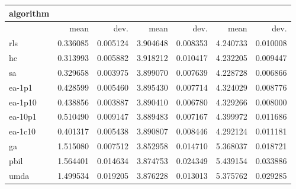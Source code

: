 \begin{tabular}{@{}l*{6}{>{{}}N{1}{2}}@{}}
\toprule
{algorithm} &  &  &  \\
\midrule
& {mean} & {dev.} & {mean} & {dev.} & {mean} & {dev.} \\
\midrule
rls & 0.336085 & 0.005124 & 3.904648 & 0.008353 & 4.240733 & 0.010008 \\
 hc & 0.313993 & 0.005882 & 3.918212 & 0.010417 & 4.232205 & 0.009447 \\
 sa & 0.329658 & 0.003975 & 3.899070 & 0.007639 & 4.228728 & 0.006866 \\
 ea-1p1 & 0.428599 & 0.005460 & 3.895430 & 0.007714 & 4.324029 & 0.008776 \\
 ea-1p10 & 0.438856 & 0.003887 & 3.890410 & 0.006780 & 4.329266 & 0.008000 \\
 ea-10p1 & 0.510490 & 0.009147 & 3.889483 & 0.007167 & 4.399972 & 0.011686 \\
 ea-1c10 & 0.401317 & 0.005438 & 3.890807 & 0.008446 & 4.292124 & 0.011181 \\
 ga & 1.515080 & 0.007512 & 3.852958 & 0.014710 & 5.368037 & 0.018721 \\
 pbil & 1.564401 & 0.014634 & 3.874753 & 0.024349 & 5.439154 & 0.033886 \\
 umda & 1.499534 & 0.019205 & 3.876228 & 0.013013 & 5.375762 & 0.029285 \\
 \bottomrule
\end{tabular}

